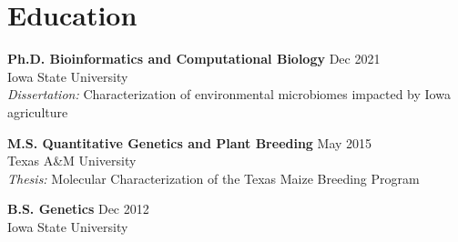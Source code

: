



\section*{Education}

\textbf{Ph.D. Bioinformatics and Computational Biology} \hfill Dec 2021 \\
Iowa State University \\
\textit{Dissertation:} Characterization of environmental microbiomes impacted by Iowa agriculture

\vspace{0.5em}

\textbf{M.S. Quantitative Genetics and Plant Breeding} \hfill May 2015 \\
Texas A\&M University \\
\textit{Thesis:} Molecular Characterization of the Texas Maize Breeding Program

\vspace{0.5em}

\textbf{B.S. Genetics} \hfill Dec 2012 \\
Iowa State University



\vspace{-1cm}
